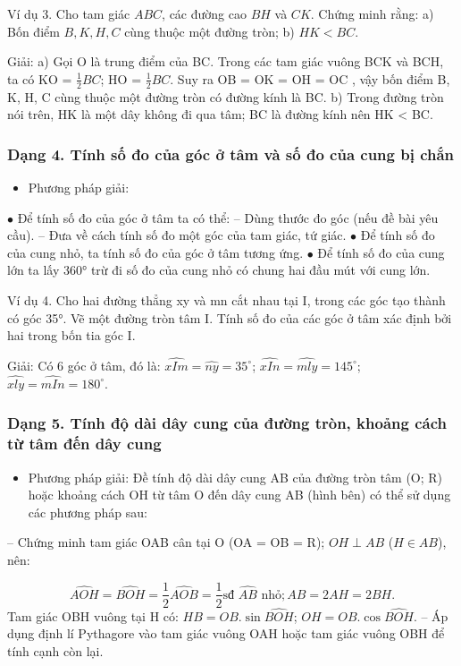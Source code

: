 \documentclass[%
    fontsize=12pt,%
    chapterprefix=false,%
    open=right,%
    twoside=false,%
    numbers=noenddot,%
    headings=optiontohead,%
    final,%
    DIV=15,%
    parskip=half %
]{scrbook}
\begin{document}
Ví dụ 3. Cho tam giác $ABC$, các đường cao $BH$ và $CK$. Chứng minh rằng: a) Bốn điểm $B, K, H, C$ cùng thuộc một đường tròn; b) $HK < BC$.


Giải: a) Gọi O là trung điểm của BC. Trong các tam giác vuông BCK và BCH, ta có KO = $ \frac{1}{2}BC $; HO = $ \frac{1}{2}BC $. Suy ra OB = OK = OH = OC , vậy bốn điểm B, K, H, C cùng thuộc một đường tròn có đường kính là BC. b) Trong đường tròn nói trên, HK là một dây không đi qua tâm; BC là đường kính nên HK < BC.
\subsubsection{Dạng 4. Tính số đo của góc ở tâm và số đo của cung bị chắn}

\begin{itemize}
  \item Phương pháp giải:
\end{itemize}

$\bullet$ Để tính số đo của góc ở tâm ta có thể: -- Dùng thước đo góc (nếu đề bài yêu cầu). -- Đưa về cách tính số đo một góc của tam giác, tứ giác. $\bullet$ Để tính số đo của cung nhỏ, ta tính số đo của góc ở tâm tương ứng. $\bullet$ Để tính số đo của cung lớn ta lấy 360° trừ đi số đo của cung nhỏ có chung hai đầu mút với cung lớn.

Ví dụ 4. Cho hai đường thẳng xy và mn cắt nhau tại I, trong các góc tạo thành có góc 35°. Vẽ một đường tròn tâm I. Tính số đo của các góc ở tâm xác định bởi hai trong bốn tia góc I.

Giải: Có 6 góc ở tâm, đó là: $ \widehat{xIm} = \widehat{ny} = 35^\circ $; $ \widehat{xIn} = \widehat{mly} = 145^\circ $; $ \widehat{xly} = \widehat{mIn} = 180^\circ $.
\subsubsection{Dạng 5. Tính độ dài dây cung của đường tròn, khoảng cách từ tâm đến dây cung}

\begin{itemize}
  \item Phương pháp giải: Đề tính độ dài dây cung AB của đường tròn tâm (O; R) hoặc khoảng cách OH từ tâm O đến dây cung AB (hình bên) có thể sử dụng các phương pháp sau:
\end{itemize}

-- Chứng minh tam giác OAB cân tại O (OA = OB = R); $ OH \perp AB $ ($ H \in AB $), nên:

\[ \widehat{AOH} = \widehat{BOH} = \frac{1}{2} \widehat{AOB} = \frac{1}{2} \text{sđ } \widehat{AB} \text{ nhỏ}; AB = 2AH = 2BH. \]
Tam giác OBH vuông tại H có: $ HB = OB.\sin \widehat{BOH} $; $ OH = OB.\cos \widehat{BOH} $. -- Áp dụng định lí Pythagore vào tam giác vuông OAH hoặc tam giác vuông OBH để tính cạnh còn lại.
\end{document}
